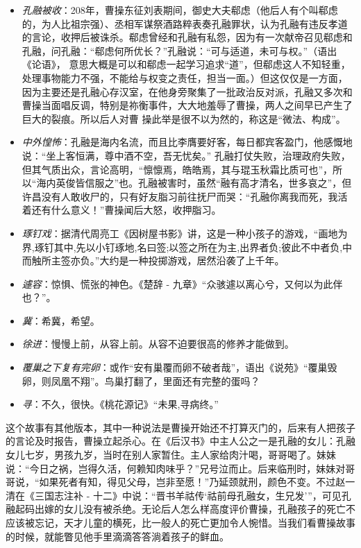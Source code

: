 \documentclass[]{book}
\providecommand{\tightlist}{%
  \setlength{\itemsep}{0pt}\setlength{\parskip}{0pt}}
\begin{document}
\begin{itemize}
\tightlist
\item
  \emph{孔融被收}：208年，曹操东征刘表期间，御史大夫郗虑（他后人有个叫郗虑的，为人比祖宗强）、丞相军谋祭酒路粹表奏孔融罪状，认为孔融有违反孝道的言论，收押后被诛杀。郗虑曾经和孔融有私怨，因为有一次献帝召见郗虑和孔融，问孔融：``郗虑何所优长？''孔融说：``可与适道，未可与权。''（语出《论语》，
  意思大概是可以和郗虑一起学习追求``道''，但郗虑这人不知轻重，处理事物能力不强，不能给与权变之责任，担当一面。）但这仅仅是一方面，因为主要还是孔融心存汉室，在他身旁聚集了一批政治反对派，孔融又多次和曹操当面唱反调，特别是祢衡事件，大大地羞辱了曹操，两人之间早已产生了巨大的裂痕。所以后人对曹
  操此举是很不以为然的，称这是``微法、构成''。
\item
  \emph{中外惶怖}：孔融是海内名流，而且比李膺要好客，每日都宾客盈门，他感慨地说：``坐上客恒满，尊中酒不空，吾无忧矣。''
  孔融打仗失败，治理政府失败，但其气质出众，言论高明，``懔懔焉，皓皓焉，其与琨玉秋霜比质可也''，所以``海内英俊皆信服之''也。孔融被害时，虽然``融有高才清名，世多哀之''，但许昌没有人敢收尸的，只有好友脂习前往抚尸而哭：``孔融你离我而死，我活着还有什么意义！''曹操闻后大怒，收押脂习。
\item
  \emph{琢钉戏}：据清代周亮工《因树屋书影》讲，这是一种小孩子的游戏，``画地为界,琢钉其中,先以小钉琢地,名曰签;以签之所在为主,出界者负;彼此不中者负,中而触所主签亦负。''大约是一种投掷游戏，居然沿袭了上千年。
\item
  \emph{遽容}：惊惧、慌张的神色。《楚辞 -
  九章》``众骇遽以离心兮，又何以为此伴也？''。
\item
  \emph{冀}：希冀，希望。
\item
  \emph{徐进}：慢慢上前，从容上前。从容不迫要很高的修养才能做到。
\item
  \emph{覆巢之下复有完卵}：或作``安有巢覆而卵不破者哉''，语出《说苑》``覆巢毁卵，则凤凰不翔''。鸟巢打翻了，里面还有完整的蛋吗？
\item
  \emph{寻}：不久，很快。《桃花源记》``未果,寻病终。''
\end{itemize}

这个故事有其他版本，其中一种说法是曹操开始还不打算灭门的，后来有人把孩子的言论及时报告，曹操立起杀心。在《后汉书》中主人公之一是孔融的女儿：孔融女儿七岁，男孩九岁，当时在别人家暂住。主人家给肉汁喝，哥哥喝了。妹妹说：``今日之祸，岂得久活，何赖知肉味乎？''兄号泣而止。后来临刑时，妹妹对哥哥说，``如果死者有知，得见父母，岂非至愿！''乃延颈就刑，颜色不变。不过赵一清在《三国志注补
-
十二》中说：``晋书羊祜传`祜前母孔融女，生兄发'''，可见孔融起码出嫁的女儿没有被杀绝。无论后人怎么样高度评价曹操，孔融孩子的死亡不应该被忘记，天才儿童的横死，比一般人的死亡更加令人惋惜。当我们看曹操故事的时候，就能瞥见他手里滴滴答答淌着孩子的鲜血。
\end{document}
